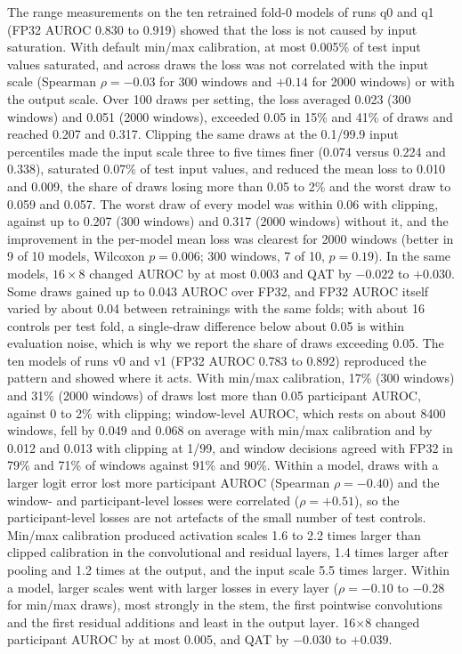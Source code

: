 \documentclass[preprint,12pt]{elsarticle}
\begin{document}
The range measurements on the ten retrained fold-0 models of runs q0 and q1 (FP32 AUROC 0.830 to 0.919) showed that the loss is not caused by input saturation. With default min/max calibration, at most 0.005\% of test input values saturated, and across draws the loss was not correlated with the input scale (Spearman $\rho=-0.03$ for 300 windows and $+0.14$ for 2000 windows) or with the output scale. Over 100 draws per setting, the loss averaged 0.023 (300 windows) and 0.051 (2000 windows), exceeded 0.05 in 15\% and 41\% of draws and reached 0.207 and 0.317. Clipping the same draws at the 0.1/99.9 input percentiles made the input scale three to five times finer (0.074 versus 0.224 and 0.338), saturated 0.07\% of test input values, and reduced the mean loss to 0.010 and 0.009, the share of draws losing more than 0.05 to 2\% and the worst draw to 0.059 and 0.057. The worst draw of every model was within 0.06 with clipping, against up to 0.207 (300 windows) and 0.317 (2000 windows) without it, and the improvement in the per-model mean loss was clearest for 2000 windows (better in 9 of 10 models, Wilcoxon $p=0.006$; 300 windows, 7 of 10, $p=0.19$). In the same models, $16\times8$ changed AUROC by at most 0.003 and QAT by $-0.022$ to $+0.030$. Some draws gained up to 0.043 AUROC over FP32, and FP32 AUROC itself varied by about 0.04 between retrainings with the same folds; with about 16 controls per test fold, a single-draw difference below about 0.05 is within evaluation noise, which is why we report the share of draws exceeding 0.05. The ten models of runs v0 and v1 (FP32 AUROC 0.783 to 0.892) reproduced the pattern and showed where it acts. With min/max calibration, 17\% (300 windows) and 31\% (2000 windows) of draws lost more than 0.05 participant AUROC, against 0 to 2\% with clipping; window-level AUROC, which rests on about 8400 windows, fell by 0.049 and 0.068 on average with min/max calibration and by 0.012 and 0.013 with clipping at 1/99, and window decisions agreed with FP32 in 79\% and 71\% of windows against 91\% and 90\%. Within a model, draws with a larger logit error lost more participant AUROC (Spearman $\rho=-0.40$) and the window- and participant-level losses were correlated ($\rho=+0.51$), so the participant-level losses are not artefacts of the small number of test controls. Min/max calibration produced activation scales 1.6 to 2.2 times larger than clipped calibration in the convolutional and residual layers, 1.4 times larger after pooling and 1.2 times at the output, and the input scale 5.5 times larger. Within a model, larger scales went with larger losses in every layer ($\rho=-0.10$ to $-0.28$ for min/max draws), most strongly in the stem, the first pointwise convolutions and the first residual additions and least in the output layer. 16$\times$8 changed participant AUROC by at most 0.005, and QAT by $-0.030$ to $+0.039$.
\end{document}
